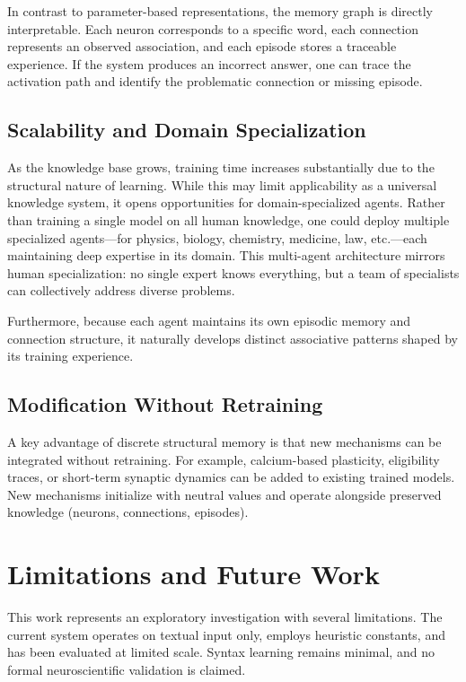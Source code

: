 \documentclass[11pt]{article}
\begin{document}
In contrast to parameter-based representations, the memory graph is directly interpretable.
Each neuron corresponds to a specific word, each connection represents an observed association,
and each episode stores a traceable experience. If the system produces an incorrect answer,
one can trace the activation path and identify the problematic connection or missing episode.

\subsection{Scalability and Domain Specialization}

As the knowledge base grows, training time increases substantially due to the structural nature of learning.
While this may limit applicability as a universal knowledge system, it opens opportunities for domain-specialized agents.
Rather than training a single model on all human knowledge, one could deploy multiple specialized agents---for physics,
biology, chemistry, medicine, law, etc.---each maintaining deep expertise in its domain. This multi-agent architecture
mirrors human specialization: no single expert knows everything, but a team of specialists can collectively address
diverse problems.

Furthermore, because each agent maintains its own episodic memory and connection structure, it naturally develops
distinct associative patterns shaped by its training experience.

\subsection{Modification Without Retraining}

A key advantage of discrete structural memory is that new mechanisms can be integrated without retraining.
For example, calcium-based plasticity, eligibility traces, or short-term synaptic dynamics can be added to existing
trained models. New mechanisms initialize with neutral values and operate alongside preserved knowledge (neurons,
connections, episodes).

\section{Limitations and Future Work}

This work represents an exploratory investigation with several limitations.
The current system operates on textual input only, employs heuristic constants,
and has been evaluated at limited scale. Syntax learning remains minimal, and no
formal neuroscientific validation is claimed.
\end{document}
